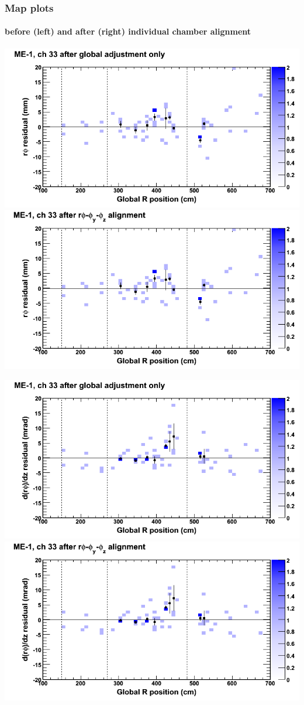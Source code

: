 \documentclass[compress]{beamer}
\begin{document}
\begin{frame}
\frametitle{Map plots}
\framesubtitle{before (left) and after (right) individual chamber alignment}
\includegraphics[width=0.5\linewidth]{ringmapplots_3dof/before_CSCvsr_mem1ch33_x.png} \includegraphics[width=0.5\linewidth]{ringmapplots_3dof/after_CSCvsr_mem1ch33_x.png}

\includegraphics[width=0.5\linewidth]{ringmapplots_3dof/before_CSCvsr_mem1ch33_dxdz.png} \includegraphics[width=0.5\linewidth]{ringmapplots_3dof/after_CSCvsr_mem1ch33_dxdz.png}
\end{frame}
\end{document}
